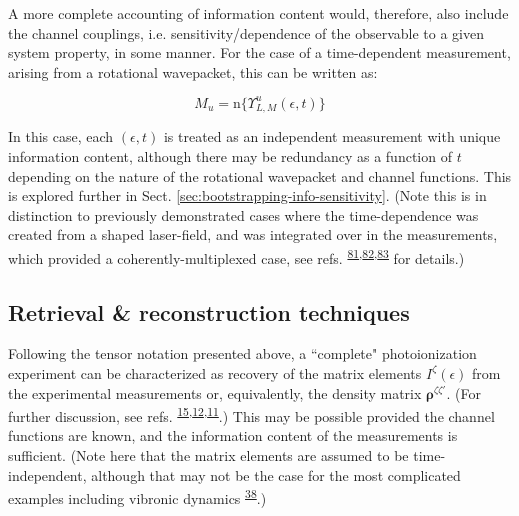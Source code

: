 \documentclass[10pt]{article}
\begin{document}
A more complete accounting of information content would, therefore,
also include the channel couplings, i.e. sensitivity/dependence of the observable to a given system property, in some manner. For the case of a time-dependent measurement, arising from a rotational wavepacket, this can be written as:

\begin{equation}
M_{u}=\mathrm{n}\{\varUpsilon_{L,M}^{u}(\epsilon,t)\}
\end{equation}

In this case, each $(\epsilon,t)$ is treated as an independent measurement with unique information content, although there may be redundancy as a function of $t$ depending on the nature of the rotational wavepacket and channel functions. This is explored further in Sect. \ref{sec:bootstrapping-info-sensitivity}. (Note this is in distinction to previously demonstrated cases where the time-dependence was created from a shaped laser-field, and was integrated over in the measurements, which provided a coherently-multiplexed case, see refs. \textsuperscript{\hyperref[csl:81]{81},\hyperref[csl:82]{82},\hyperref[csl:83]{83}} for details.)










\subsection{Retrieval \& reconstruction techniques\label{sec:recon-techniques-intro}}


Following the tensor notation presented above, a ``complete" photoionization experiment can be characterized as recovery of the matrix elements $I^{\zeta}(\epsilon)$ from the experimental measurements or, equivalently, the density matrix $\mathbf{\rho}^{\zeta\zeta'}$. (For further discussion, see refs. \textsuperscript{\hyperref[csl:15]{15},\hyperref[csl:12]{12},\hyperref[csl:11]{11}}.) This may be possible provided the channel functions are known, and the information content of the measurements is sufficient. (Note here that the matrix elements are assumed to be time-independent, although that may not be the case for the most complicated examples including vibronic dynamics \textsuperscript{\hyperref[csl:38]{38}}.) 
\end{document}

